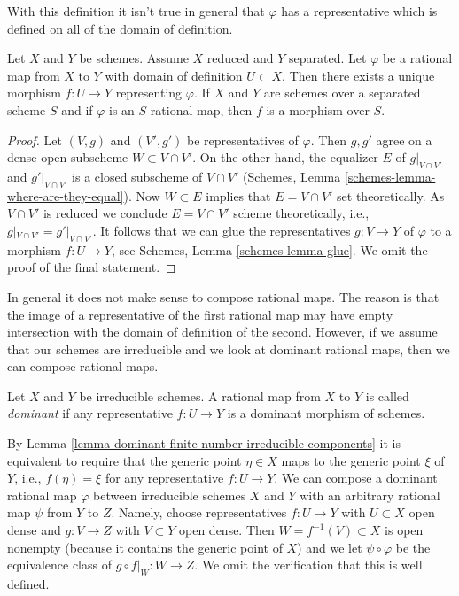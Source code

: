 \noindent
With this definition it isn't true in general that $\varphi$ has a
representative which is defined on all of the domain of definition.

\begin{lemma}
\label{lemma-rational-map-from-reduced-to-separated}
Let $X$ and $Y$ be schemes. Assume $X$ reduced and $Y$ separated. Let
$\varphi$ be a rational map from $X$ to $Y$ with domain of definition
$U \subset X$. Then there exists a unique morphism $f : U \to Y$
representing $\varphi$. If $X$ and $Y$ are schemes over a separated
scheme $S$ and if $\varphi$ is an $S$-rational map, then $f$ is a
morphism over $S$.
\end{lemma}

\begin{proof}
Let $(V, g)$ and $(V', g')$ be representatives of $\varphi$. Then
$g, g'$ agree on a dense open subscheme $W \subset V \cap V'$.
On the other hand, the equalizer $E$ of $g|_{V \cap V'}$ and $g'|_{V \cap V'}$
is a closed subscheme of $V \cap V'$ (Schemes, Lemma
\ref{schemes-lemma-where-are-they-equal}). Now $W \subset E$
implies that $E = V \cap V'$ set theoretically. As $V \cap V'$
is reduced we conclude $E = V \cap V'$ scheme theoretically, i.e.,
$g|_{V \cap V'} = g'|_{V \cap V'}$. It follows that we can glue the
representatives $g : V \to Y$ of $\varphi$ to a morphism $f : U \to Y$, see
Schemes, Lemma \ref{schemes-lemma-glue}.
We omit the proof of the final statement.
\end{proof}

\noindent
In general it does not make sense to compose rational maps. The reason
is that the image of a representative of the first rational map may
have empty intersection with the domain of definition of the second.
However, if we assume that our schemes are irreducible and we look
at dominant rational maps, then we can compose rational maps.

\begin{definition}
\label{definition-dominant-rational}
Let $X$ and $Y$ be irreducible schemes. A rational map from $X$ to $Y$
is called {\it dominant} if any representative $f : U \to Y$ is a dominant
morphism of schemes.
\end{definition}

\noindent
By Lemma \ref{lemma-dominant-finite-number-irreducible-components}
it is equivalent to require that the generic point $\eta \in X$
maps to the generic point $\xi$ of $Y$, i.e., $f(\eta) = \xi$ for
any representative $f : U \to Y$. We can compose a dominant rational map
$\varphi$ between irreducible schemes $X$ and $Y$ with an arbitrary rational
map $\psi$ from $Y$ to $Z$. Namely, choose
representatives $f : U \to Y$ with $U \subset X$ open dense
and $g : V \to Z$ with $V \subset Y$ open dense. Then
$W = f^{-1}(V) \subset X$ is open nonempty (because it contains the
generic point of $X$) and we let $\psi \circ \varphi$ be the
equivalence class of $g \circ f|_W : W \to Z$. We omit the verification
that this is well defined.

